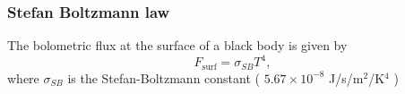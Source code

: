 \subsubsection{Stefan Boltzmann law}
The bolometric flux at the surface of a black body is given by
%
\begin{equation}
	F_\text{surf} = \sigma_{SB} T^4,
\end{equation}
%
where \( \sigma_{SB} \) is the Stefan-Boltzmann constant ( \( 5.67 \times 10^{-8} \) J/s/m\( ^2 \)/K\( ^4 \) )







